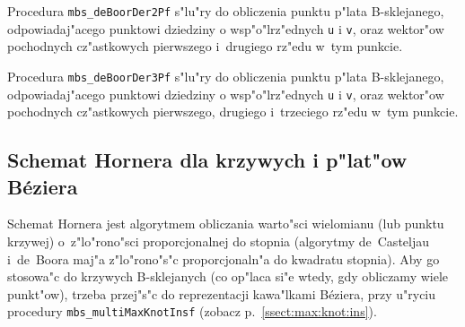 \vspace{\bigskipamount}
Procedura \texttt{mbs\_deBoorDer2Pf} s"lu"ry do obliczenia punktu p"lata
B-sklejanego, odpowiadaj"acego punktowi
dziedziny o wsp"o"lrz"ednych \texttt{u} i \texttt{v}, oraz wektor"ow
pochodnych cz"astkowych pierwszego i~drugiego rz"edu w~tym punkcie.

\vspace{\bigskipamount}
Procedura \texttt{mbs\_deBoorDer3Pf} s"lu"ry do obliczenia punktu p"lata
B-sklejanego, odpowiadaj"acego punktowi
dziedziny o wsp"o"lrz"ednych \texttt{u} i \texttt{v}, oraz wektor"ow
pochodnych cz"astkowych pierwszego, drugiego i~trzeciego rz"edu w~tym punkcie.



\subsection{Schemat Hornera dla krzywych i p"lat"ow B\'{e}ziera}

Schemat Hornera jest algorytmem obliczania warto"sci wielomianu (lub punktu
krzywej) o~z"lo"rono"sci proporcjonalnej do stopnia (algorytmy de~Casteljau
i~de~Boora maj"a z"lo"rono"s"c proporcjonaln"a do kwadratu stopnia). Aby go
stosowa"c do krzywych B-sklejanych (co op"laca si"e wtedy, gdy obliczamy
wiele punkt"ow), trzeba przej"s"c do reprezentacji kawa"lkami B\'{e}ziera,
przy u"ryciu procedury \texttt{mbs\_multiMaxKnotInsf} (zobacz
p.~\ref{ssect:max:knot:ins}).

